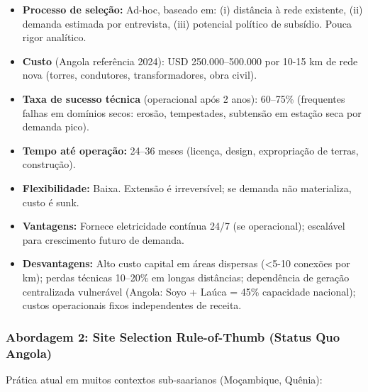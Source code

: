 \documentclass[12pt, a4paper]{article}
\begin{document}
\begin{itemize}
\item \textbf{Processo de seleção:} Ad-hoc, baseado em: (i) distância à rede existente, (ii) demanda estimada por entrevista, (iii) potencial político de subsídio. Pouca rigor analítico.

\item \textbf{Custo} (Angola referência 2024): USD 250.000--500.000 por 10-15 km de rede nova (torres, condutores, transformadores, obra civil).

\item \textbf{Taxa de sucesso técnica} (operacional após 2 anos): 60--75\% (frequentes falhas em domínios secos: erosão, tempestades, subtensão em estação seca por demanda pico).

\item \textbf{Tempo até operação:} 24--36 meses (licença, design, expropriação de terras, construção).

\item \textbf{Flexibilidade:} Baixa. Extensão é irreversível; se demanda não materializa, custo é sunk.

\item \textbf{Vantagens:} Fornece eletricidade contínua 24/7 (se operacional); escalável para crescimento futuro de demanda.

\item \textbf{Desvantagens:} Alto custo capital em áreas dispersas (<5-10 conexões por km); perdas técnicas 10--20\% em longas distâncias; dependência de geração centralizada vulnerável (Angola: Soyo + Laúca = 45\% capacidade nacional); custos operacionais fixos independentes de receita.
\end{itemize}

\subsubsection{Abordagem 2: Site Selection Rule-of-Thumb (Status Quo Angola)}

Prática atual em muitos contextos sub-saarianos (Moçambique, Quênia):
\end{document}
